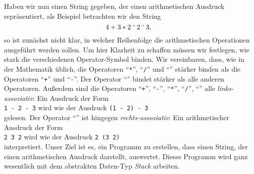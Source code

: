 Haben wir nun einen String gegeben, der einen arithmetischen Ausdruck repr\"asentiert, als
Beispiel betrachten wir den String
\[ 4 + 3 * 2 \mathop{\mathtt{\symbol{94}}} 2 \mathop{\mathtt{\symbol{94}}} 3, \]
so ist zun\"achst nicht klar, in welcher Reihenfolge die arithmetischen Operationen
ausgef\"uhrt werden sollen.   Um hier Klarheit zu schaffen m\"ussen wir festlegen, wie stark die
verschiedenen Operator-Symbol binden. Wir
vereinbaren, dass, wie in der Mathematik \"ublich, die Operatoren ``\texttt{*}'',
``\texttt{/}'' und ``\texttt{}'' st\"arker binden als die
Operatoren ``\texttt{+}'' und ``\texttt{-}''.  Der Operator ``\texttt{}''
bindet st\"arker als alle anderen Operatoren.
Au{\ss}erdem sind die Operatoren ``\texttt{+}'', ``\texttt{-}'', ``\texttt{*}'',
``\texttt{/}'', ``\texttt{}'' alle \emph{links-assoziativ}:  Ein Ausdruck der
Form \\[0.1cm]
\hspace*{1.3cm} \texttt{1 - 2 - 3} \quad wird  wie der Ausdruck \quad \texttt{(1 - 2) - 3} \\[0.1cm]
gelesen.  Der Operator ``\texttt{}'' ist hingegen \emph{rechts-assoziativ}: Ein
arithmetischer Ausdruck der Form \\[0.1cm]
\hspace*{1.3cm} \texttt{2  3  2} \quad wird  wie der Ausdruck \quad 
\texttt{2  (3  2)} \\[0.1cm]
interpretiert.  Unser Ziel ist es, ein Programm zu erstellen, dass einen String, der
einen arithmetischen Ausdruck darstellt, auswertet.  Dieses Programm wird ganz wesentlich
mit dem abstrakten Daten-Typ \textsl{Stack} arbeiten.


